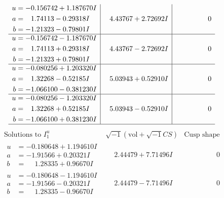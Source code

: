 \documentclass[1p]{elsarticle_modified}
\theoremstyle{definition}
\newcommand{\I}{\sqrt{-1}}
\begin{document}
$$\begin{array}{c|c|c}
\begin{aligned}
u &= -0.156742 + 1.187670 I \\
a &= \phantom{-}1.74113 - 0.29318 I \\
b &= -1.21323 - 0.79801 I\end{aligned}
 & \phantom{-}4.43767 + 2.72692 I & \phantom{-0.000000 } 0 \\ \hline\begin{aligned}
u &= -0.156742 - 1.187670 I \\
a &= \phantom{-}1.74113 + 0.29318 I \\
b &= -1.21323 + 0.79801 I\end{aligned}
 & \phantom{-}4.43767 - 2.72692 I & \phantom{-0.000000 } 0 \\ \hline\begin{aligned}
u &= -0.080256 + 1.203320 I \\
a &= \phantom{-}1.32268 - 0.52185 I \\
b &= -1.066100 - 0.381230 I\end{aligned}
 & \phantom{-}5.03943 + 0.52910 I & \phantom{-0.000000 } 0 \\ \hline\begin{aligned}
u &= -0.080256 - 1.203320 I \\
a &= \phantom{-}1.32268 + 0.52185 I \\
b &= -1.066100 + 0.381230 I\end{aligned}
 & \phantom{-}5.03943 - 0.52910 I & \phantom{-0.000000 } 0\\
 \hline 
 \end{array}$$\newpage$$\begin{array}{c|c|c}  
\text{Solutions to }I^u_{1}& \I (\text{vol} + \sqrt{-1}CS) & \text{Cusp shape}\\
 \hline 
\begin{aligned}
u &= -0.180648 + 1.194610 I \\
a &= -1.91566 + 0.20321 I \\
b &= \phantom{-}1.28335 + 0.96670 I\end{aligned}
 & \phantom{-}2.44479 + 7.71496 I & \phantom{-0.000000 } 0 \\ \hline\begin{aligned}
u &= -0.180648 - 1.194610 I \\
a &= -1.91566 - 0.20321 I \\
b &= \phantom{-}1.28335 - 0.96670 I\end{aligned}
 & \phantom{-}2.44479 - 7.71496 I & \phantom{-0.000000 } 0 \\ \hline\begin{aligned}

\end{aligned}
\end{array}$$
\end{document}
